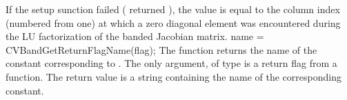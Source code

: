 {
  If the {\cvband} setup sunction failed ( returned ),
  the value  is equal to the column index (numbered from one) at which
  a zero diagonal element was encountered during the LU factorization of the 
  banded Jacobian matrix.
}
{
  name = CVBandGetReturnFlagName(flag);
}
{
  The function  returns the
  name of the {\cvband} constant corresponding to .
}
{
  The only argument, of type  is a return flag from a {\cvband} function.
}
{
  The return value is a string containing the name of the corresponding constant.
}
{}

